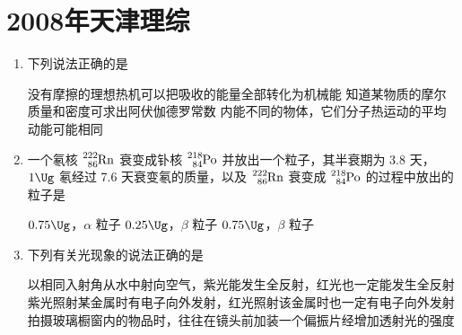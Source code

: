 \documentclass[\gkver]{gaokaozhenti}
\begin{document}
\chapter{2008年天津理综}

\begin{enumerate}
\item
下列说法正确的是

{没有摩擦的理想热机可以把吸收的能量全部转化为机械能}
{知道某物质的摩尔质量和密度可求出阿伏伽德罗常数}
{内能不同的物体，它们分子热运动的平均动能可能相同}


\item
一个氡核 $\ce{^{222}_{86}Rn}$ 衰变成钋核 $\ce{^{218}_{84}Po}$ 并放出一个粒子，其半衰期为 3.8 天，$1\Ug$ 氡经过 7.6 天衰变氡的质量，以及 $\ce{^{222}_{86}Rn}$ 衰变成 $\ce{^{218}_{84}Po}$ 的过程中放出的粒子是

{$0.75\Ug$，$\alpha$ 粒子}
{$0.25\Ug$，$\beta$ 粒子}
{$0.75\Ug$，$\beta$ 粒子}


\item
下列有关光现象的说法正确的是

{以相同入射角从水中射向空气，紫光能发生全反射，红光也一定能发生全反射}
{紫光照射某金属时有电子向外发射，红光照射该金属时也一定有电子向外发射}
{拍摄玻璃橱窗内的物品时，往往在镜头前加装一个偏振片经增加透射光的强度}


\end{enumerate}
\end{document}
